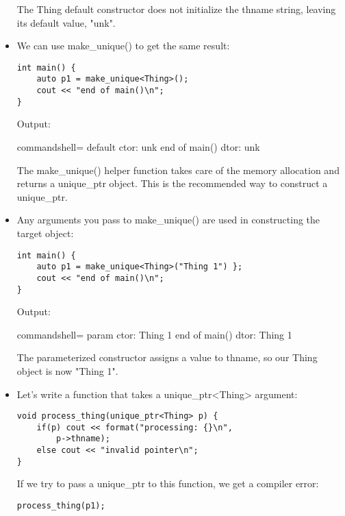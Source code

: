 \begin{itemize}
The Thing default constructor does not initialize the thname string, leaving its default value, "unk".

\item 
We can use make\_unique() to get the same result:

\begin{lstlisting}[style=styleCXX]
int main() {
	auto p1 = make_unique<Thing>();
	cout << "end of main()\n";
}
\end{lstlisting}

Output:

\begin{tcblisting}{commandshell={}}
default ctor: unk
end of main()
dtor: unk
\end{tcblisting}

The make\_unique() helper function takes care of the memory allocation and returns a unique\_ptr object. This is the recommended way to construct a unique\_ptr.

\item 
Any arguments you pass to make\_unique() are used in constructing the target object:

\begin{lstlisting}[style=styleCXX]
int main() {
	auto p1 = make_unique<Thing>("Thing 1") };
	cout << "end of main()\n";
}
\end{lstlisting}

Output:

\begin{tcblisting}{commandshell={}}
param ctor: Thing 1
end of main()
dtor: Thing 1
\end{tcblisting}

The parameterized constructor assigns a value to thname, so our Thing object is now "Thing 1".

\item 
Let's write a function that takes a unique\_ptr<Thing> argument:

\begin{lstlisting}[style=styleCXX]
void process_thing(unique_ptr<Thing> p) {
	if(p) cout << format("processing: {}\n",
		p->thname);
	else cout << "invalid pointer\n";
}
\end{lstlisting}

If we try to pass a unique\_ptr to this function, we get a compiler error:

\begin{lstlisting}[style=styleCXX]
process_thing(p1);
\end{lstlisting}


\end{itemize}
